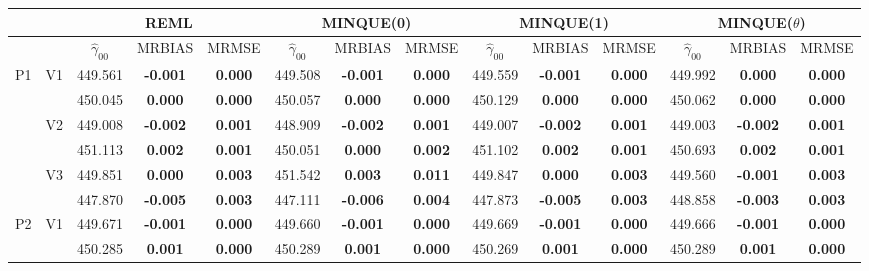 \documentclass[11pt,a4paper]{article}
\begin{document}
{
\begin{sidewaystable}[H]
\centering
\captionsetup{width=20cm}
{\scriptsize
\begin{tabular}{cc|ccc|ccc|ccc|ccc|}
   & & \multicolumn{3}{c|}{REML}&\multicolumn{3}{c|}{MINQUE(0)}&\multicolumn{3}{c|}{MINQUE(1)}&\multicolumn{3}{c|}{MINQUE($\theta$)}\\ \hline
 &  & $\hat{\gamma}_{00}$ & MRBIAS & MRMSE & $\hat{\gamma}_{00}$ & MRBIAS & MRMSE & $\hat{\gamma}_{00}$ & MRBIAS & MRMSE & $\hat{\gamma}_{00}$ & MRBIAS & MRMSE \\ 
  \hline
\multirow{6}{*}{P1} & \multirow{2}{*}{V1} & 449.561 & \textbf{-0.001} & \textbf{0.000} & 449.508 & \textbf{-0.001} & \textbf{0.000} & 449.559 & \textbf{-0.001} & \textbf{0.000} & 449.992 & \textbf{0.000} & \textbf{0.000} \\ 
   &  & 450.045 & \textbf{0.000} & \textbf{0.000} & 450.057 & \textbf{0.000} & \textbf{0.000} & 450.129 & \textbf{0.000} & \textbf{0.000} & 450.062 & \textbf{0.000} & \textbf{0.000} \\ 
   & \multirow{2}{*}{V2} & 449.008 & \textbf{-0.002} & \textbf{0.001} & 448.909 & \textbf{-0.002} & \textbf{0.001} & 449.007 & \textbf{-0.002} & \textbf{0.001} & 449.003 & \textbf{-0.002} & \textbf{0.001} \\ 
   &  & 451.113 & \textbf{0.002} & \textbf{0.001} & 450.051 & \textbf{0.000} & \textbf{0.002} & 451.102 & \textbf{0.002} & \textbf{0.001} & 450.693 & \textbf{0.002} & \textbf{0.001} \\ 
   & \multirow{2}{*}{V3} & 449.851 & \textbf{0.000} & \textbf{0.003} & 451.542 & \textbf{0.003} & \textbf{0.011} & 449.847 & \textbf{0.000} & \textbf{0.003} & 449.560 & \textbf{-0.001} & \textbf{0.003} \\ 
   &  & 447.870 & \textbf{-0.005} & \textbf{0.003} & 447.111 & \textbf{-0.006} & \textbf{0.004} & 447.873 & \textbf{-0.005} & \textbf{0.003} & 448.858 & \textbf{-0.003} & \textbf{0.003} \\ 
   \hline \hline\multirow{6}{*}{P2} & \multirow{2}{*}{V1} & 449.671 & \textbf{-0.001} & \textbf{0.000} & 449.660 & \textbf{-0.001} & \textbf{0.000} & 449.669 & \textbf{-0.001} & \textbf{0.000} & 449.666 & \textbf{-0.001} & \textbf{0.000} \\ 
   &  & 450.285 & \textbf{0.001} & \textbf{0.000} & 450.289 & \textbf{0.001} & \textbf{0.000} & 450.269 & \textbf{0.001} & \textbf{0.000} & 450.289 & \textbf{0.001} & \textbf{0.000} \\ 

\end{tabular}}
\end{sidewaystable}}
\end{document}
